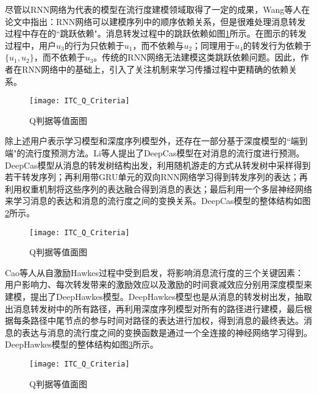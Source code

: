 尽管以RNN网络为代表的模型在流行度建模领域取得了一定的成果，Wang等人\citep{wang2017cascade}在论文中指出：RNN网络可以建模序列中的顺序依赖关系，但是很难处理消息转发过程中存在的``跳跃依赖"。消息转发过程中的跳跃依赖如图\ref{fig:crossDependence}所示。在图示的转发过程中，用户$u_3$的行为只依赖于$u_1$，而不依赖与$u_2$；同理用于$u_4$的转发行为依赖于$\{u_1,u_2\}$，而不依赖于$u_3$。传统的RNN网络无法建模这类跳跃依赖问题。因此，作者在RNN网络中的基础上，引入了关注机制\citep{bahdanau2014neural}来学习传播过程中更精确的依赖关系。
\begin{figure}[!htbp]
  \centering
  \texttt{[image: ITC\_Q\_Criteria]}
  \caption{Q判据等值面图}
  \label{fig:crossDependence}
\end{figure}

除上述用户表示学习模型和深度序列模型外，还存在一部分基于深度模型的``端到端"的流行度预测方法。Li等人\citep{li2017deepcas}提出了DeepCas模型在对消息的流行度进行预测。DeepCas模型从消息的转发树结构出发，利用随机游走\citep{spitzer2013principles}的方式从转发树中采样得到若干转发序列；再利用带GRU单元的双向RNN网络学习得到转发序列的表达；再利用权重机制将这些序列的表达融合得到消息的表达；最后利用一个多层神经网络来学习消息的表达和消息的流行度之间的变换关系。DeepCas模型的整体结构如图\ref{fig:deepCas}所示。
\begin{figure}[!htbp]
  \centering
  \texttt{[image: ITC\_Q\_Criteria]}
  \caption{Q判据等值面图}
  \label{fig:deepCas}
\end{figure}

Cao等人\citep{cao2017deep}从自激励Hawkes过程中受到启发，将影响消息流行度的三个关键因素：用户影响力、每次转发带来的激励效应以及激励的时间衰减效应分别用深度模型来建模，提出了DeepHawkes模型。DeepHawkes模型也是从消息的转发树出发，抽取出消息转发树中的所有路径，再利用深度序列模型对所有的路径进行建模，最后根据每条路径中尾节点的参与时间对路径的表达进行加权，得到消息的最终表达。消息的表达与消息的流行度之间的变换函数是通过一个全连接的神经网络学习得到。DeepHawkes模型的整体结构如图\ref{fig:deepHawkes}所示。
\begin{figure}[!htbp]
  \centering
  \texttt{[image: ITC\_Q\_Criteria]}
  \caption{Q判据等值面图}
  \label{fig:deepHawkes}
\end{figure}


